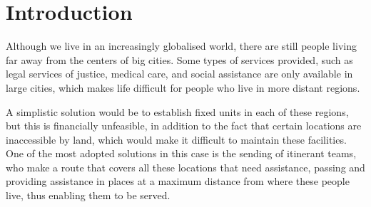 \documentclass{singlecol-new}
\theoremstyle{TH}{
\newtheorem{lemma}{Lemma}
\newtheorem{theorem}[lemma]{Theorem}
\newtheorem{corrolary}[lemma]{Corrolary}
\newtheorem{conjecture}[lemma]{Conjecture}
\newtheorem{proposition}[lemma]{Proposition}
\newtheorem{claim}[lemma]{Claim}
\newtheorem{stheorem}[lemma]{Wrong Theorem}
}
\theoremstyle{THrm}{
\newtheorem{definition}{Definition}[section]
\newtheorem{question}{Question}[section]
\newtheorem{remark}{Remark}
\newtheorem{scheme}{Scheme}
}
\theoremstyle{THhit}{
\newtheorem{case}{Case}[section]
}
\begin{document}
\begin{bio}


\end{bio}


\maketitle

\section{Introduction}
\label{sec:intro}
Although we live in an increasingly globalised world, there are still people living far away from the centers of big cities. Some types of services provided, such as legal services of justice, medical care, and social assistance are only available in large cities, which makes life difficult for people who live in more distant regions.

A simplistic solution would be to establish fixed units in each of these regions, but this is financially unfeasible, in addition to the fact that certain locations are inaccessible by land, which would make it difficult to maintain these facilities. One of the most adopted solutions in this case is the sending of itinerant teams, who make a route that covers all these locations that need assistance, passing and providing assistance in places at a maximum distance from where these people live, thus enabling them to be served.
\end{document}
